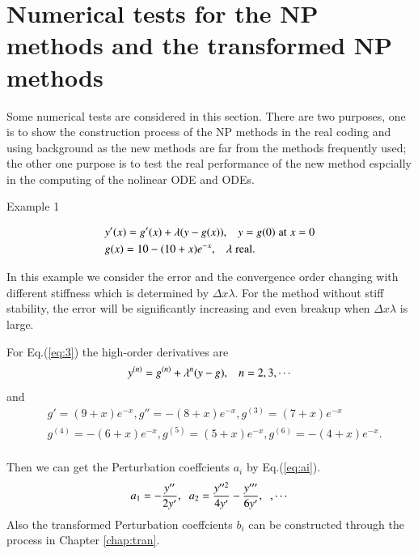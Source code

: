 \documentclass[review]{elsarticle}
\theoremstyle{plain}\newtheorem{definition}{\sc{Definition}}
\theoremstyle{defination}\newtheorem{example}{Example}[section]
\numberwithin{equation}{section}
\numberwithin{table}{section}
\begin{document}
{\section{Numerical tests for the NP methods and the transformed NP methods}
Some numerical tests are considered in this section. There are two purposes, one is to show the construction process of the NP methods in  the real coding and using background as the new methods are far from the methods frequently used; the other one purpose is to test the real performance of the new method espcially in the  computing of the nolinear ODE and ODEs.

Example 1 \cite{Seinfeld1970Review,Prothero1974On}

\begin{equation} \label{eq:3}
  \begin{aligned}
	&y'(x)=g'(x)+\lambda (y-g(x)), \hspace{0.3cm} y=g(0) \hspace{0.1cm}  \text{at} \hspace{0.1cm} x=0\\
	&g(x)=10-(10+x)e^{-x},  \hspace{0.3cm} \lambda \hspace{0.1cm} \text{real}.
  \end{aligned}
  \end{equation}

  In this example we consider the error and the convergence order changing with different stiffness which is determined  by $\Delta x \lambda$. For the method without stiff stability, the error will be significantly increasing and even breakup  when $\Delta x \lambda$ is large. 

  For Eq.(\ref{eq:3}) the high-order derivatives are
\begin{equation}
  y^{(n)}=g^{(n)}+\lambda^n (y-g) , \hspace{0.3cm} n=2,3,\cdots
\end{equation}
and
\begin{equation}
  \begin{aligned}
  &g'=(9+x)e^{-x},
  g''=-(8+x)e^{-x},
  g^{(3)}=(7+x)e^{-x}\\
  &g^{(4)}=-(6+x)e^{-x},
  g^{(5)}=(5+x)e^{-x},
  g^{(6)}=-(4+x)e^{-x}.\\
  \end{aligned}
  \end{equation}

  Then we can get the Perturbation coeffcients $a_i$ by Eq.(\ref{eq:ai}). 
  \begin{equation}
	a_1=-\frac{y''}{2y'},\hspace{0.2cm} a_2=\frac{y''^2}{4y'}-\frac{y'''}{6y'},\hspace{0.2cm},\cdots
	\end{equation}
	Also the transformed Perturbation coeffcients $b_i$ can be  constructed through the process in Chapter \ref{chap:tran}.

}
\end{document}
